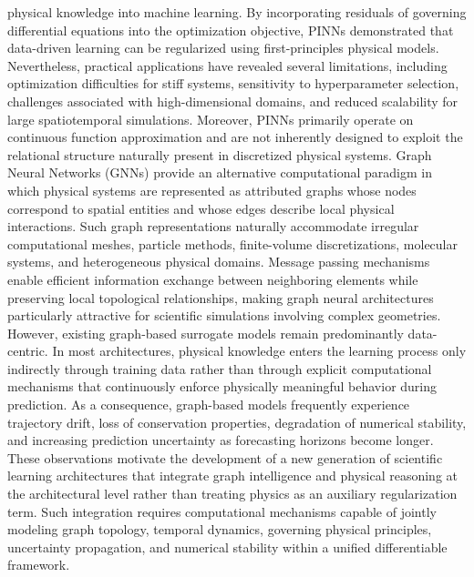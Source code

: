 physical knowledge into machine learning. By incorporating residuals of governing differential equations into the optimization objective, PINNs demonstrated that data-driven learning can be regularized using first-principles physical models. Nevertheless, practical applications have revealed several limitations, including optimization difficulties for stiff systems, sensitivity to hyperparameter selection, challenges associated with high-dimensional domains, and reduced scalability for large spatiotemporal simulations. Moreover, PINNs primarily operate on continuous function approximation and are not inherently designed to exploit the relational structure naturally present in discretized physical systems. Graph Neural Networks (GNNs) provide an alternative computational paradigm in which physical systems are represented as attributed graphs whose nodes correspond to spatial entities and whose edges describe local physical interactions. Such graph representations naturally accommodate irregular computational meshes, particle methods, finite-volume discretizations, molecular systems, and heterogeneous physical domains. Message passing mechanisms enable efficient information exchange between neighboring elements while preserving local topological relationships, making graph neural architectures particularly attractive for scientific simulations involving complex geometries. However, existing graph-based surrogate models remain predominantly data-centric. In most architectures, physical knowledge enters the learning process only indirectly through training data rather than through explicit computational mechanisms that continuously enforce physically meaningful behavior during prediction. As a consequence, graph-based models frequently experience trajectory drift, loss of conservation properties, degradation of numerical stability, and increasing prediction uncertainty as forecasting horizons become longer. These observations motivate the development of a new generation of scientific learning architectures that integrate graph intelligence and physical reasoning at the architectural level rather than treating physics as an auxiliary regularization term. Such integration requires computational mechanisms capable of jointly modeling graph topology, temporal dynamics, governing physical principles, uncertainty propagation, and numerical stability within a unified differentiable framework. \] 